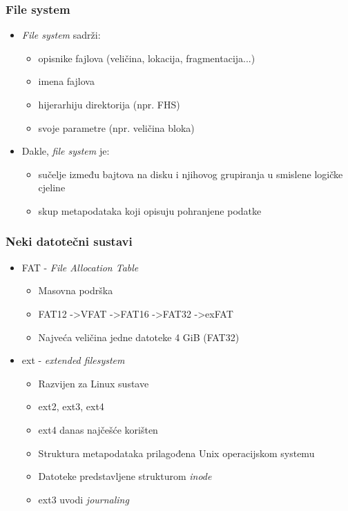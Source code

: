 \documentclass[t]{beamer}
\begin{document}
\begin{frame}
	\frametitle{File system}
	\begin{itemize}
		\item \textit{File system} sadrži:
		\begin{itemize}
			\item opisnike fajlova (veličina, lokacija, fragmentacija...)
			\item imena fajlova
			\item hijerarhiju direktorija (npr. FHS)
			\item svoje parametre (npr. veličina bloka)
		\end{itemize}
		\vfill
	    \item Dakle, \textit{file system} je:
	    \begin{itemize}
	    	\item sučelje između bajtova na disku i njihovog grupiranja u smislene logičke cjeline
	    	\item skup metapodataka koji opisuju pohranjene podatke
	    \end{itemize}
    \end{itemize}
\end{frame}




\begin{frame}
	\frametitle{Neki datotečni sustavi}
	\begin{itemize}
		\item FAT - \emph{File Allocation Table}\
		\begin{itemize}
			\item Masovna podrška
			\item FAT12 -\textgreater VFAT -\textgreater FAT16 -\textgreater FAT32 -\textgreater exFAT
			\item Najveća veličina jedne datoteke 4 GiB (FAT32)
		\end{itemize}
		\item ext - \emph{extended filesystem}
		\begin{itemize}
			\item Razvijen za Linux sustave
			\item ext2, ext3, ext4
			\item ext4 danas najčešće korišten
			\item Struktura metapodataka prilagođena Unix operacijskom systemu	
			\item Datoteke predstavljene strukturom \emph{inode}
			\item ext3 uvodi \emph{journaling}
		\end{itemize}
	\end{itemize}
\end{frame}
\end{document}
